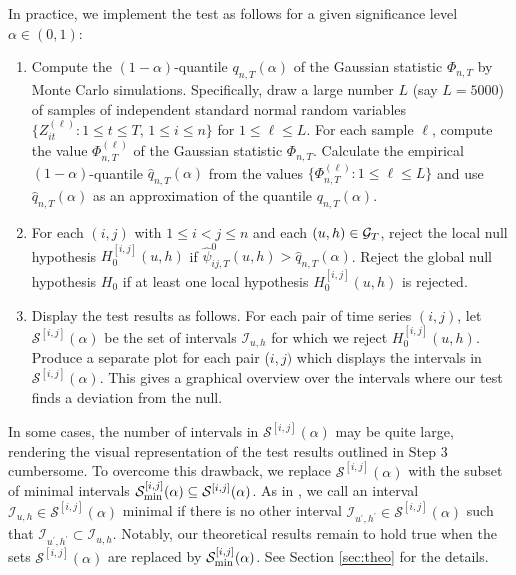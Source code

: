 \documentclass[12pt]{article}
\begin{document}
In practice, we implement the test as follows for a given significance level $\alpha \in (0, 1)$:
\begin{enumerate}[label=\textit{Step \arabic*.}, leftmargin=1.45cm,itemsep=0pt,parsep=0pt,topsep=3pt]
\item Compute the $(1-\alpha)$-quantile $q_{n, T}(\alpha)$ of the Gaussian statistic $\Phi_{n,T}$ by Monte Carlo simulations. Specifically, draw a large number $L$ (say $L=5000$) of samples of independent standard normal random variables $\{Z_{it}^{(\ell)} : 1 \le t \le T, \, 1 \le i \le n \}$ for $1 \le \ell \le L$. For each sample $\ell$, compute the value $\Phi_{n,T}^{(\ell)}$ of the Gaussian statistic $\Phi_{n, T}$. Calculate the empirical $(1-\alpha)$-quantile $\widehat{q}_{n, T}(\alpha)$ from the values $\{ \Phi_{n, T}^{(\ell)}: 1 \le \ell \le L \}$ and use $\widehat{q}_{n, T}(\alpha)$ as an approximation of the quantile $q_{n, T}(\alpha)$.
\item For each $(i, j)$ with $1 \le i < j \le n$ and each $(u, h) \in \mathcal{G}_T$, reject the local null hypothesis $H_0^{[i, j]}(u, h)$ if $\widehat{\psi}^0_{ij, T}(u, h)> \widehat{q}_{n, T}(\alpha)$. Reject the global null hypothesis $H_0$ if at least one local hypothesis $H_0^{[i, j]}(u, h)$ is rejected. 
\item Display the test results as follows. For each pair of time series $(i,j)$, let $\mathcal{S}^{[i, j]}(\alpha)$ be the set of intervals $\mathcal{I}_{u, h}$ for which we reject $H_0^{[i, j]}(u, h)$. Produce a separate plot for each pair ($i,j)$ which displays the intervals in $\mathcal{S}^{[i, j]}(\alpha)$. This gives a graphical overview over the intervals where our test finds a deviation from the null. 
\end{enumerate}


\begin{remark} 
In some cases, the number of intervals in $\mathcal{S}^{[i, j]}(\alpha)$ may be quite large, rendering the visual representation of the test results outlined in Step 3 cumbersome. To overcome this drawback, we replace $\mathcal{S}^{[i, j]}(\alpha)$ with the subset of minimal intervals $\mathcal{S}^{[i, j]}_{\textnormal{min}}(\alpha) \subseteq \mathcal{S}^{[i, j]}(\alpha)$. As in \cite{Duembgen2002}, we call an interval $\mathcal{I}_{u, h} \in \mathcal{S}^{[i, j]}(\alpha)$ minimal if there is no other interval $\mathcal{I}_{u^\prime, h^\prime} \in \mathcal{S}^{[i, j]}(\alpha)$ such that $\mathcal{I}_{u^\prime, h^\prime} \subset \mathcal{I}_{u, h}$. Notably, our theoretical results remain to hold true when the sets $\mathcal{S}^{[i, j]}(\alpha)$ are replaced by $\mathcal{S}^{[i, j]}_{\textnormal{min}}(\alpha)$. See Section \ref{sec:theo} for the details. 
\end{remark}
\end{document}
